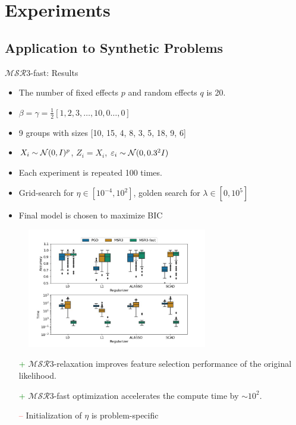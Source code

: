 \documentclass[8pt]{beamer}
\newcommand{\ouralgo}{\ensuremath{\mathcal{MSR}3}}
\begin{document}
\section{Experiments}
\subsection{Application to Synthetic Problems}

\begin{frame}{$\ouralgo$-fast: Results}
\begin{itemize}
	\item The number of fixed effects $p$ and random effects $q$ is 20.
	\item $\beta = \gamma = \frac{1}{2}[1,2,3,\dots,10, 0\dots,0]$
	\item 9 groups with sizes [10, 15, 4, 8, 3, 5, 18, 9, 6]
	\item $X_i \sim \operatorname{\mathcal{N}}(0, I)^p$, $Z_i = X_i$, $\varepsilon_i \sim \operatorname{\mathcal{N}}(0, 0.3^2I)$
	\item Each experiment is repeated 100 times.
	\item Grid-search for $\eta \in [10^{-4}, 10^{2}]$, golden search for $\lambda \in [0, 10^5]$
	\item Final model is chosen to maximize BIC
\end{itemize}
\begin{figure}
	\includegraphics[width=0.7\textwidth]{Figures/benchmark.jpg}
\end{figure}
\begin{itemize}
	\item[\textcolor{green}{+}] $\ouralgo$-relaxation improves feature selection performance of the original likelihood.
	\item[\textcolor{green}{+}] $\ouralgo$-fast optimization accelerates the compute time by $\sim 10^2$.
   	\item[\textcolor{red}{--}] Initialization of $\eta$ is problem-specific
\end{itemize}
\end{frame}
\end{document}
